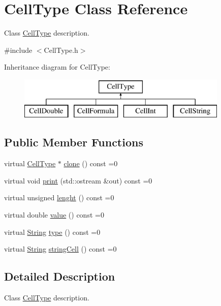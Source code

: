 \hypertarget{class_cell_type}{}\section{Cell\+Type Class Reference}
\label{class_cell_type}


Class \hyperlink{class_cell_type}{Cell\+Type} description.  




{\ttfamily \#include $<$Cell\+Type.\+h$>$}

Inheritance diagram for Cell\+Type\+:\begin{figure}[H]
\begin{center}
\leavevmode
\includegraphics[height=2.000000cm]{class_cell_type}
\end{center}
\end{figure}
\subsection*{Public Member Functions}
\begin{DoxyCompactItemize}
\item 
virtual \hyperlink{class_cell_type}{Cell\+Type} $\ast$ \hyperlink{class_cell_type_a8c534b1eed27659429f761fc76d51b89}{clone} () const =0
\item 
virtual void \hyperlink{class_cell_type_a34413fcb76f292b6b8d08615765ba894}{print} (std\+::ostream \&out) const =0
\item 
virtual unsigned \hyperlink{class_cell_type_a1f8bd268dbd474dd8e08726a6efac066}{lenght} () const =0
\item 
virtual double \hyperlink{class_cell_type_a6cbfc477f605049f2a007d8674442230}{value} () const =0
\item 
virtual \hyperlink{class_string}{String} \hyperlink{class_cell_type_ae31acfe1efc7776796d85918886247af}{type} () const =0
\item 
virtual \hyperlink{class_string}{String} \hyperlink{class_cell_type_abba4d6d43efa340144d1ad09637e1aa9}{string\+Cell} () const =0
\end{DoxyCompactItemize}


\subsection{Detailed Description}
Class \hyperlink{class_cell_type}{Cell\+Type} description. 

